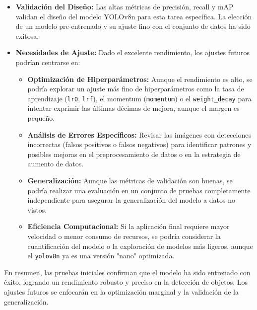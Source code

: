 \documentclass{article}
\begin{document}
\begin{itemize}
    \item \textbf{Validación del Diseño:} Las altas métricas de precisión, recall y mAP validan el diseño del modelo YOLOv8n para esta tarea específica. La elección de un modelo pre-entrenado y su ajuste fino con el conjunto de datos ha sido exitosa.
    \item \textbf{Necesidades de Ajuste:} Dado el excelente rendimiento, los ajustes futuros podrían centrarse en:
    \begin{itemize}
        \item \textbf{Optimización de Hiperparámetros:} Aunque el rendimiento es alto, se podría explorar un ajuste más fino de hiperparámetros como la tasa de aprendizaje (\texttt{lr0}, \texttt{lrf}), el momentum (\texttt{momentum}) o el \texttt{weight\_decay} para intentar exprimir las últimas décimas de mejora, aunque el margen es pequeño.
        \item \textbf{Análisis de Errores Específicos:} Revisar las imágenes con detecciones incorrectas (falsos positivos o falsos negativos) para identificar patrones y posibles mejoras en el preprocesamiento de datos o en la estrategia de aumento de datos.
        \item \textbf{Generalización:} Aunque las métricas de validación son buenas, se podría realizar una evaluación en un conjunto de pruebas completamente independiente para asegurar la generalización del modelo a datos no vistos.
        \item \textbf{Eficiencia Computacional:} Si la aplicación final requiere mayor velocidad o menor consumo de recursos, se podría considerar la cuantificación del modelo o la exploración de modelos más ligeros, aunque el \texttt{yolov8n} ya es una versión "nano" optimizada.
    \end{itemize}
\end{itemize}

En resumen, las pruebas iniciales confirman que el modelo ha sido entrenado con éxito, logrando un rendimiento robusto y preciso en la detección de objetos. Los ajustes futuros se enfocarán en la optimización marginal y la validación de la generalización.
\end{document}

